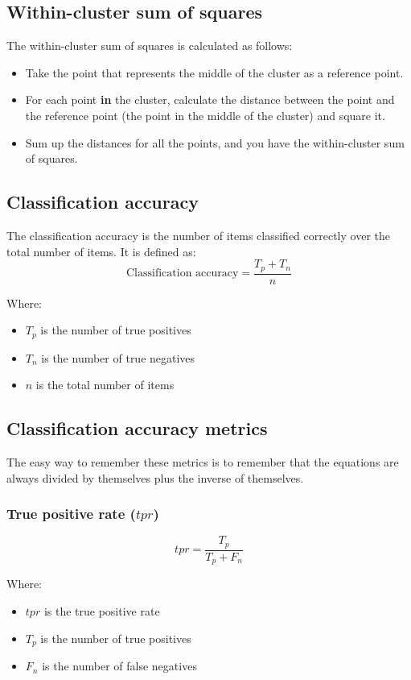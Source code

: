 \documentclass[11pt]{article}
\begin{document}
\subsection{Within-cluster sum of squares}
\label{sec:orgb876a5f}
The within-cluster sum of squares is calculated as follows:
\begin{itemize}
\item Take the point that represents the middle of the cluster as a reference point.
\item For each point \textbf{in} the cluster, calculate the distance between the point and the reference point (the point in the middle of the cluster) and square it.
\item Sum up the distances for all the points, and you have the within-cluster sum of squares.
\end{itemize}
\subsection{Classification accuracy}
\label{sec:orgae1895b}
The classification accuracy is the number of items classified correctly over the total number of items. It is defined as:
\[\text{Classification accuracy} = \frac{T_p + T_n}{n}\]

Where:
\begin{itemize}
\item \(T_p\) is the number of true positives
\item \(T_n\) is the number of true negatives
\item \(n\) is the total number of items
\end{itemize}
\subsection{Classification accuracy metrics}
\label{sec:org55280e3}
The easy way to remember these metrics is to remember that the equations are always divided by themselves plus the inverse of themselves.
\subsubsection{True positive rate (\(tpr\))}
\label{sec:org1aa8795}
\[tpr = \frac{T_p}{T_p + F_n}\]

Where:
\begin{itemize}
\item \(tpr\) is the true positive rate
\item \(T_p\) is the number of true positives
\item \(F_n\) is the number of false negatives
\end{itemize}
\end{document}
